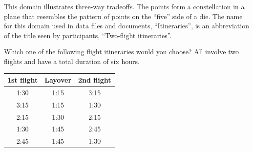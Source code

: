 This domain illustrates three-way tradeoffs.
The points form a constellation in a plane that resembles the pattern of points on the ``five'' side of a die.
The name for this domain used in data files and documents, ``Itineraries'', is an abbreviation of the title seen by participants, ``Two-flight itineraries''.

\begin{tcolorbox}
Which one of the following flight itineraries would you choose? All involve two
flights and have a total duration of six hours.

\begin{tabular}{ccc}
\hline
	1st flight & Layover & 2nd flight \\ \hline
	1:30 & 1:15 & 3:15 \\ 
	3:15 & 1:15 & 1:30 \\ 
	2:15 & 1:30 & 2:15 \\ 
	1:30 & 1:45 & 2:45 \\ 
	2:45 & 1:45 & 1:30 \\ \hline
\end{tabular}
\end{tcolorbox}
